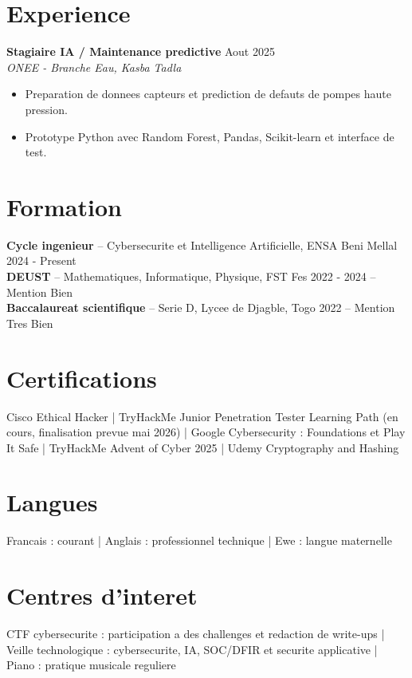 \documentclass[10pt,a4paper]{article}
\newcommand{\role}[3]{%
  \textbf{#1} \hfill #3\\
  \textit{#2}\vspace{1pt}
}
\newcommand{\edu}[4]{%
  \textbf{#1} -- #2 \hfill #3 #4\\[3pt]
}
\begin{document}
\section{Experience}
\role{Stagiaire IA / Maintenance predictive}{ONEE - Branche Eau, Kasba Tadla}{Aout 2025}
\begin{itemize}
  \item Preparation de donnees capteurs et prediction de defauts de pompes haute pression.
  \item Prototype Python avec Random Forest, Pandas, Scikit-learn et interface de test.
\end{itemize}

\section{Formation}
\edu{Cycle ingenieur}{Cybersecurite et Intelligence Artificielle, ENSA Beni Mellal}{2024 - Present}{}
\edu{DEUST}{Mathematiques, Informatique, Physique, FST Fes}{2022 - 2024}{-- Mention Bien}
\edu{Baccalaureat scientifique}{Serie D, Lycee de Djagble, Togo}{2022}{-- Mention Tres Bien}

\section{Certifications}
Cisco Ethical Hacker | TryHackMe Junior Penetration Tester Learning Path (en cours, finalisation prevue mai 2026) | Google Cybersecurity : Foundations et Play It Safe | TryHackMe Advent of Cyber 2025 | Udemy Cryptography and Hashing

\section{Langues}
Francais : courant | Anglais : professionnel technique | Ewe : langue maternelle

\section{Centres d'interet}
CTF cybersecurite : participation a des challenges et redaction de write-ups | Veille technologique : cybersecurite, IA, SOC/DFIR et securite applicative | Piano : pratique musicale reguliere
\end{document}
